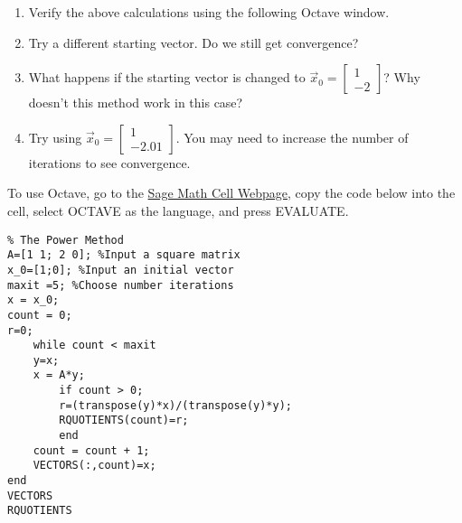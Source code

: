 \documentclass{ximera}
\begin{document}
\begin{exploration}
\begin{enumerate}
    \item\label{exp:2x2PowerMethod_a} Verify the above calculations using the following Octave window.
    \item\label{exp:2x2PowerMethod_b} Try a different starting vector.  Do we still get convergence?
    \item\label{exp:2x2PowerMethod_c} What happens if the starting vector is changed to $\vec{x}_{0} = \left[ \begin{array}{rr}
  1 \\
  -2
  \end{array}\right]$?  Why doesn't this method work in this case?
  \item\label{exp:2x2PowerMethod_d} Try using $\vec{x}_{0} = \left[ \begin{array}{rr}
  1 \\
  -2.01
  \end{array}\right]$.  You may need to increase the number of iterations to see convergence.
\end{enumerate}

To use Octave, go to the \href{https://sagecell.sagemath.org/}{Sage Math Cell Webpage}, copy the code below into the cell, select OCTAVE as the language, and press EVALUATE.

\begin{verbatim}
% The Power Method
A=[1 1; 2 0]; %Input a square matrix
x_0=[1;0]; %Input an initial vector
maxit =5; %Choose number iterations
x = x_0;
count = 0;
r=0;
    while count < maxit
    y=x;
    x = A*y;
        if count > 0; 
        r=(transpose(y)*x)/(transpose(y)*y);
        RQUOTIENTS(count)=r;
        end
    count = count + 1;
    VECTORS(:,count)=x;
end
VECTORS
RQUOTIENTS
\end{verbatim}

\end{exploration}
\end{document}
